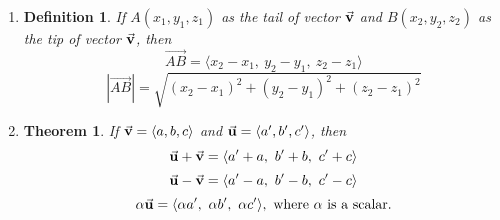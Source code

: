 \documentclass[12pt,a4paper]{article}
\newtheorem{thm}{Theorem}[subsection]
\newtheorem{df}{Definition}[subsection]
\def\vecv{\va{v}}
\def\vecu{\va{u}}
\begin{document}
\begin{enumerate}
\begin{center}
	\end{center}
	\item \begin{df} If $A(x_1,y_1,z_1)$ as the tail of vector $\vecv$ and $B(x_2,y_2,z_2)$ as the tip of vector $\vecv$, then \[\overrightarrow{AB}=\langle x_2-x_1,\ y_2-y_1,\ z_2-z_1\rangle\]\[|\overrightarrow{AB}|=\sqrt{(x_2-x_1)^2+(y_2-y_1)^2+(z_2-z_1)^2}\]\end{df}
	\item \begin{thm}If $\vecv=\langle a,b,c\rangle$ and $\vecu=\langle a',b',c'\rangle$, then \[\vecu+\vecv=\langle a'+a,\ b'+b,\ c'+c\rangle\]\[\vecu-\vecv=\langle a'-a,\ b'-b,\ c'-c\rangle\]\[\alpha\vecu=\langle\alpha a',\ \alpha b',\ \alpha c'\rangle,\text{ where }\alpha\text{ is a scalar.}\]\end{thm}
\end{enumerate}
\end{document}
